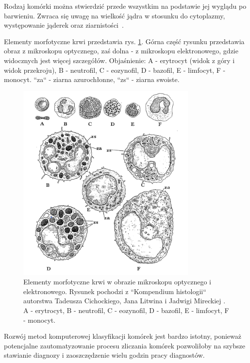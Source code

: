 Rodzaj komórki można stwierdzić przede wszystkim na podstawie jej wyglądu po barwieniu.
Zwraca się uwagę na wielkość jądra w stosunku do cytoplazmy, występowanie jąderek oraz ziarnistości~\cite{histology}.

Elementy morfotyczne krwi przedstawia rys. \ref{fig:electron_microscope}.
Górna część rysunku przedstawia obraz z mikroskopu optycznego, zaś dolna - z mikroskopu elektronowego, gdzie widocznych jest więcej szczegółów.
Objaśnienie: A - erytrocyt (widok z góry i widok przekroju), B - neutrofil, C - eozynofil, D - bazofil, E - limfocyt, F - monocyt. “za“ - ziarna azurochłonne, “zs“
- ziarna swoiste.

\begin{figure}
    \centering
    \includegraphics[width=0.8\textwidth]{images/morfotyczne}
    \caption{Elementy morfotyczne krwi w obrazie mikroskopu optycznego i elektronowego. Rysunek pochodzi z “Kompendium histologii“ autorstwa Tadeusza Cichockiego, Jana Litwina i Jadwigi Mireckiej \cite{histology}. A - erytrocyt, B - neutrofil, C - eozynofil, D - bazofil, E - limfocyt, F - monocyt.}
    \label{fig:electron_microscope}
\end{figure}

Rozwój metod komputerowej klasyfikacji komórek jest bardzo istotny, ponieważ potencjalne zautomatyzowanie procesu zliczania komórek pozwoliłoby na szybsze stawianie diagnozy i zaoszczędzenie wielu godzin pracy diagnostów.

